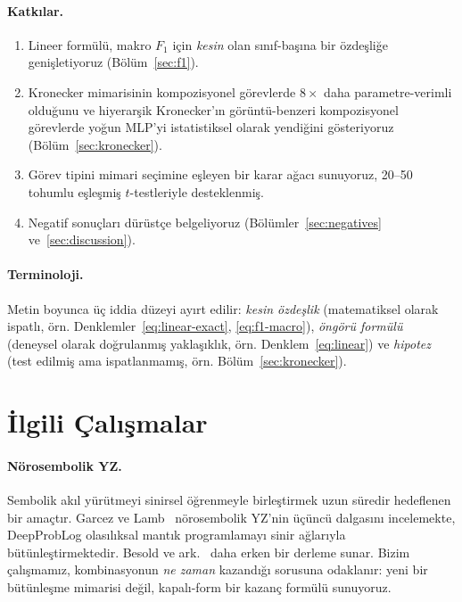 \documentclass[11pt,a4paper]{article}
\begin{document}
\paragraph{Katkılar.}
\begin{enumerate}
\item Lineer formülü, makro $F_1$ için \emph{kesin} olan
sınıf-başına bir özdeşliğe genişletiyoruz (Bölüm~\ref{sec:f1}).
\item Kronecker mimarisinin kompozisyonel görevlerde $8\times$ daha
parametre-verimli olduğunu ve hiyerarşik Kronecker'ın görüntü-benzeri
kompozisyonel görevlerde yoğun MLP'yi istatistiksel olarak yendiğini
gösteriyoruz (Bölüm~\ref{sec:kronecker}).
\item Görev tipini mimari seçimine eşleyen bir karar ağacı sunuyoruz,
20--50 tohumlu eşleşmiş $t$-testleriyle desteklenmiş.
\item Negatif sonuçları dürüstçe belgeliyoruz
(Bölümler~\ref{sec:negatives} ve~\ref{sec:discussion}).
\end{enumerate}

\paragraph{Terminoloji.}
Metin boyunca üç iddia düzeyi ayırt edilir:
\emph{kesin özdeşlik} (matematiksel olarak ispatlı, örn.
Denklemler~\ref{eq:linear-exact}, \ref{eq:f1-macro}),
\emph{öngörü formülü} (deneysel olarak doğrulanmış yaklaşıklık,
örn. Denklem~\ref{eq:linear}) ve
\emph{hipotez} (test edilmiş ama ispatlanmamış, örn.
Bölüm~\ref{sec:kronecker}).


\section{İlgili Çalışmalar}
\label{sec:related}

\paragraph{Nörosembolik YZ.}
Sembolik akıl yürütmeyi sinirsel öğrenmeyle birleştirmek uzun süredir
hedeflenen bir amaçtır. Garcez ve Lamb~\cite{garcez2023neurosymbolic}
nörosembolik YZ'nin üçüncü dalgasını incelemekte, DeepProbLog
\cite{manhaeve2018deepproblog} olasılıksal mantık programlamayı
sinir ağlarıyla bütünleştirmektedir. Besold ve
ark.~\cite{besold2017neural} daha erken bir derleme sunar. Bizim
çalışmamız, kombinasyonun \emph{ne zaman} kazandığı sorusuna
odaklanır: yeni bir bütünleşme mimarisi değil, kapalı-form bir
kazanç formülü sunuyoruz.
\end{document}
